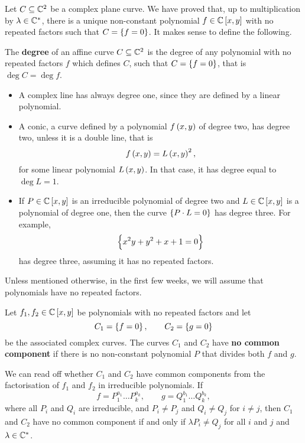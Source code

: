 \pagebreak

Let $ C \subseteq \mathbb{C}^2 $ be a complex plane curve. We have proved that, up to multiplication by $ \lambda \in \mathbb{C}^* $, there is a unique non-constant polynomial $ f \in \CC\sbr{x, y} $ with no repeated factors such that $ C = \cbr{f = 0} $. It makes sense to define the following.

\begin{definition}
The \textbf{degree} of an affine curve $ C \subseteq \mathbb{C}^2 $ is the degree of any polynomial with no repeated factors $ f $ which defines $ C $, such that $ C = \cbr{f = 0} $, that is $ \deg C = \deg f $.
\end{definition}

\begin{example}
\hfill
\begin{itemize}
\item A complex line has always degree one, since they are defined by a linear polynomial.
\item A conic, a curve defined by a polynomial $ f\br{x, y} $ of degree two, has degree two, unless it is a double line, that is
$$ f\br{x, y} = L\br{x, y}^2, $$
for some linear polynomial $ L\br{x, y} $. In that case, it has degree equal to $ \deg L = 1 $.
\item If $ P \in \CC\sbr{x, y} $ is an irreducible polynomial of degree two and $ L \in \CC\sbr{x, y} $ is a polynomial of degree one, then the curve $ \cbr{P \cdot L = 0} $ has degree three. For example,
$$ \cbr{x^2y + y^2 + x + 1 = 0} $$
has degree three, assuming it has no repeated factors.
\end{itemize}
\end{example}

Unless mentioned otherwise, in the first few weeks, we will assume that polynomials have no repeated factors.

\begin{definition}
Let $ f_1, f_2 \in \CC\sbr{x, y} $ be polynomials with no repeated factors and let
$$ C_1 = \cbr{f = 0}, \qquad C_2 = \cbr{g = 0} $$
be the associated complex curves. The curves $ C_1 $ and $ C_2 $ have \textbf{no common component} if there is no non-constant polynomial $ P $ that divides both $ f $ and $ g $.
\end{definition}

We can read off whether $ C_1 $ and $ C_2 $ have common components from the factorisation of $ f_1 $ and $ f_2 $ in irreducible polynomials. If
$$ f = P_1^{a_1} \dots P_k^{a_k}, \qquad g = Q_1^{b_1} \dots Q_k^{b_k}, $$
where all $ P_i $ and $ Q_i $ are irreducible, and $ P_i \ne P_j $ and $ Q_i \ne Q_j $ for $ i \ne j $, then $ C_1 $ and $ C_2 $ have no common component if and only if $ \lambda P_i \ne Q_j $ for all $ i $ and $ j $ and $ \lambda \in \mathbb{C}^* $.

